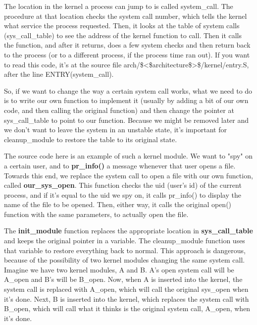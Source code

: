 \documentclass[11pt]{article}
\begin{document}
The location in the kernel a process can jump to is called system\_call. The procedure at that location checks the system call number, which tells the kernel what service the process requested. Then, it looks at the table of system calls (sys\_call\_table) to see the address of the kernel function to call. Then it calls the function, and after it returns, does a few system checks and then return back to the process (or to a different process, if the process time ran out). If you want to read this code, it's at the source file arch/\$<\$architecture\$>\$/kernel/entry.S, after the line ENTRY(system\_call).

So, if we want to change the way a certain system call works, what we need to do is to write our own function to implement it (usually by adding a bit of our own code, and then calling the original function) and then change the pointer at sys\_call\_table to point to our function. Because we might be removed later and we don't want to leave the system in an unstable state, it's important for cleanup\_module to restore the table to its original state.

The source code here is an example of such a kernel module. We want to "spy" on a certain user, and to \textbf{pr\_info()} a message whenever that user opens a file. Towards this end, we replace the system call to open a file with our own function, called \textbf{our\_sys\_open}. This function checks the uid (user's id) of the current process, and if it's equal to the uid we spy on, it calls pr\_info() to display the name of the file to be opened. Then, either way, it calls the original open() function with the same parameters, to actually open the file.

The \textbf{init\_module} function replaces the appropriate location in \textbf{sys\_call\_table} and keeps the original pointer in a variable. The cleanup\_module function uses that variable to restore everything back to normal. This approach is dangerous, because of the possibility of two kernel modules changing the same system call. Imagine we have two kernel modules, A and B. A's open system call will be A\_open and B's will be B\_open. Now, when A is inserted into the kernel, the system call is replaced with A\_open, which will call the original sys\_open when it's done. Next, B is inserted into the kernel, which replaces the system call with B\_open, which will call what it thinks is the original system call, A\_open, when it's done.
\end{document}
